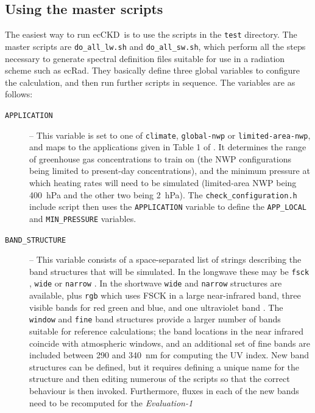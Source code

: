 \documentclass[a4,oneside]{article}
\def\codesize{\small}
\newcommand{\ecckd}{ecCKD}
\def\codesize{\small}
\def\code#1{{\codesize\texttt{#1}}}
\begin{document}
\subsection{Using the master scripts}
\label{sec:master}
The easiest way to run \ecckd\ is to use the scripts in the
\code{test} directory. The master scripts are \code{do\_all\_lw.sh}
and \code{do\_all\_sw.sh}, which perform all the steps necessary to
generate spectral definition files suitable for use in a radiation
scheme such as ecRad. They basically define three global variables to
configure the calculation, and then run further scripts in
sequence. The variables are as follows:
\begin{description}
\item[\code{APPLICATION}] -- This variable is set to one of
  \code{climate}, \code{global-nwp} or \code{limited-area-nwp}, and
  maps to the applications given in Table 1 of \cite{Hogan&2020}. It
  determines the range of greenhouse gas concentrations to train on
  (the NWP configurations being limited to present-day
  concentrations), and the minimum pressure at which heating rates
  will need to be simulated (limited-area NWP being 400~hPa and the
  other two being 2~hPa). The \code{check\_configuration.h} include
  script then uses the \code{APPLICATION} variable to define the
  \code{APP\_LOCAL} and \code{MIN\_PRESSURE} variables.
\item[\code{BAND\_STRUCTURE}] -- This variable consists of a
  space-separated list of strings describing the band structures that
  will be simulated.  In the longwave these may be \code{fsck}
  \citep[the full-spectrum correlated-$k$ method, FSCK, described
    by][]{Hogan2010}, \code{wide} or \code{narrow} \citep[the band
    structures proposed by][]{Hogan&2020}. In the shortwave
  \code{wide} and \code{narrow} structures are available, plus
  \code{rgb} which uses FSCK in a large near-infrared band, three
  visible bands for red green and blue, and one ultraviolet band
  \citep{Hogan&2022}. The \code{window} and \code{fine} band
  structures provide a larger number of bands suitable for reference
  calculations; the band locations in the near infrared coincide with
  atmospheric windows, and an additional set of fine bands are
  included between 290 and 340~nm for computing the UV index. New band
  structures can be defined, but it requires defining a unique name
  for the structure and then editing numerous of the scripts so that
  the correct behaviour is then invoked. Furthermore, fluxes in each
  of the new bands need to be recomputed for the \emph{Evaluation-1}

\end{description}
\end{document}
